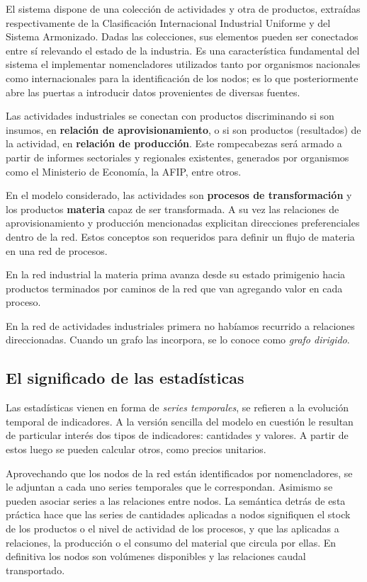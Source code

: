 \documentclass[a4paper]{report}
\begin{document}
El sistema dispone de una colección de actividades y otra de productos, extraídas respectivamente de la Clasificación Internacional Industrial Uniforme y del Sistema Armonizado. Dadas las colecciones, sus elementos pueden ser conectados entre sí relevando el estado de la industria. Es una característica fundamental del sistema el implementar nomencladores utilizados tanto por organismos nacionales como internacionales para la identificación de los nodos; es lo que posteriormente abre las puertas a introducir datos provenientes de diversas fuentes.

Las actividades industriales se conectan con productos discriminando si son insumos, en \textbf{relación de aprovisionamiento}, o si son productos (resultados) de la actividad, en \textbf{relación de producción}. Este rompecabezas será armado a partir de informes sectoriales y regionales existentes, generados por organismos como el Ministerio de Economía, la AFIP, entre otros.

En el modelo considerado, las actividades son \textbf{procesos de transformación} y los productos \textbf{materia} capaz de ser transformada. A su vez las relaciones de aprovisionamiento y producción mencionadas explicitan direcciones preferenciales dentro de la red. Estos conceptos son requeridos para definir un flujo de materia en una red de procesos.

En la red industrial la materia prima avanza desde su estado primigenio hacia productos terminados por caminos de la red que van agregando valor en cada proceso.

En la red de actividades industriales primera no habíamos recurrido a relaciones direccionadas. Cuando un grafo las incorpora, se lo conoce como \textit{grafo dirigido}.

\subsection*{El significado de las estadísticas}

Las estadísticas vienen en forma de \textit{series temporales}, se refieren a la evolución temporal de indicadores. A la versión sencilla del modelo en cuestión le resultan de particular interés dos tipos de indicadores: cantidades y valores. A partir de estos luego se pueden calcular otros, como precios unitarios.

Aprovechando que los nodos de la red están identificados por nomencladores, se le adjuntan a cada uno series temporales que le correspondan. Asimismo se pueden asociar series a las relaciones entre nodos. La semántica detrás de esta práctica hace que las series de cantidades aplicadas a nodos signifiquen el stock de los productos o el nivel de actividad de los procesos, y que las aplicadas a relaciones, la producción o el consumo del material que circula por ellas. En definitiva los nodos son volúmenes disponibles y las relaciones caudal transportado.
\end{document}
